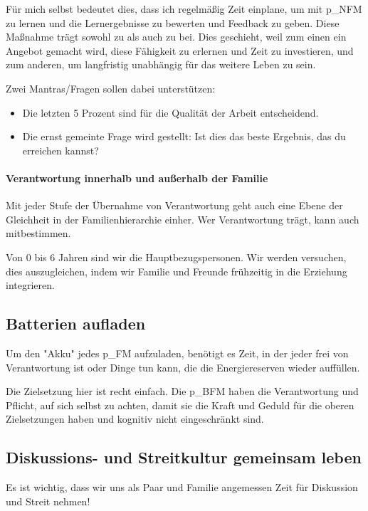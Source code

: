Für mich selbst bedeutet dies, dass ich regelmäßig Zeit einplane, um mit \gls{p_NFM} zu lernen und die Lernergebnisse zu bewerten und Feedback zu geben. Diese Maßnahme trägt sowohl zu \NFMOOne als auch zu \NFMOThree bei. Dies geschieht, weil zum einen ein Angebot gemacht wird, diese Fähigkeit zu erlernen und Zeit zu investieren, und zum anderen, um langfristig unabhängig für das weitere Leben zu sein.

Zwei Mantras/Fragen sollen dabei unterstützen:
\begin{itemize}
	\item Die letzten 5 Prozent sind für die Qualität der Arbeit entscheidend.
	\item Die ernst gemeinte Frage wird gestellt: Ist dies das beste Ergebnis, das du erreichen kannst?
\end{itemize}

\paragraph{Verantwortung innerhalb und außerhalb der Familie}

Mit jeder Stufe der Übernahme von Verantwortung geht auch eine Ebene der Gleichheit in der Familienhierarchie einher. Wer Verantwortung trägt, kann auch mitbestimmen.

Von 0 bis 6 Jahren sind wir die Hauptbezugspersonen. Wir werden versuchen, dies auszugleichen, indem wir Familie und Freunde frühzeitig in die Erziehung integrieren.

\subsection{Batterien aufladen}

Um den "Akku" jedes \gls{p_FM} aufzuladen, benötigt es Zeit, in der jeder frei von Verantwortung ist oder Dinge tun kann, die die Energiereserven wieder auffüllen.

Die Zielsetzung hier ist recht einfach. Die \gls{p_BFM} haben die Verantwortung und Pflicht, auf sich selbst zu achten, damit sie die Kraft und Geduld für die oberen Zielsetzungen haben und kognitiv nicht eingeschränkt sind.

\subsection{Diskussions- und Streitkultur gemeinsam leben}\label{subsec_LeitendePrinzipien_Diskussionskultur}

Es ist wichtig, dass wir uns als Paar und Familie angemessen Zeit für Diskussion und Streit nehmen!\\


